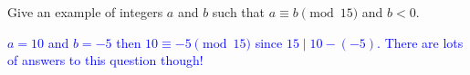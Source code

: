 \documentclass[10pt]{article}
\newcommand{\blue}{\textcolor{blue}}
\newcommand{\bs}{\begin{solution}}
\begin{document}
\begin{itemize}
Give an example of integers $a$ and $b$ such that $a\equiv b \pmod{15}$ and $b<0$.
\bs\blue{$a = 10$ and $b=-5$ then $10\equiv -5\pmod{15}$ since $15\mid 10-(-5)$. There are lots of answers to this question though!}\end{solution}
\vspace{1in}
\end{itemize}
\end{document}
